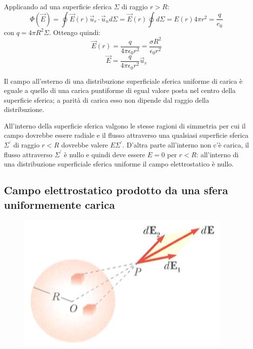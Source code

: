 \documentclass[class=book, crop=false, oneside, 12pt]{standalone}
\begin{document}
Applicando ad una superficie sferica \(\Sigma\) di raggio \(r > R\):
\begin{equation*}
    \Phi (\overrightarrow{E}) = \oint \overrightarrow{E}(r) \overrightarrow{u}_r \cdot \overrightarrow{u}_n d \Sigma = \overrightarrow{E}(r) \oint d \Sigma = E(r) 4 \pi r^2 = \frac{q}{e_0}
\end{equation*}
con \(q = 4 \pi R^2 \Sigma\). Ottengo quindi:
\begin{equation*}
    \overrightarrow{E}(r) = \frac{q}{4 \pi \epsilon_0 r^2} = \frac{\sigma R^2}{\epsilon_0 r^2}
\end{equation*}
\begin{equation*}
    \overrightarrow{E} = \frac{q}{4 \pi \epsilon_0 r^2} \overrightarrow{u}_r
\end{equation*}

Il campo all'esterno di una distribuzione superficiale sferica uniforme di carica è eguale a quello di una carica puntiforme di egual valore posta nel centro della superficie sferica; a parità di carica esso non dipende dal raggio della distribuzione.

All'interno della superficie sferica valgono le stesse ragioni di simmetria per cui il campo dovrebbe essere radiale e il flusso attraverso una qualsiasi superficie sferica \(\Sigma^{\prime}\) di raggio \(r < R\) dovrebbe valere \(E \Sigma^{\prime}\).
D'altra parte all'interno non c'è carica, il flusso attraverso \(\Sigma^{\prime}\) è nullo e quindi deve essere \(E = 0\) per \(r < R\): all'interno di una distribuzione superficiale sferica uniforme il campo elettrostatico è nullo.

\subsection{Campo elettrostatico prodotto da una sfera uniformemente carica}

\begin{figure}[h]
    \includegraphics[scale=0.4]{sfera_carica_piena.png}
    \centering
    \caption{}
\end{figure}
\end{document}
